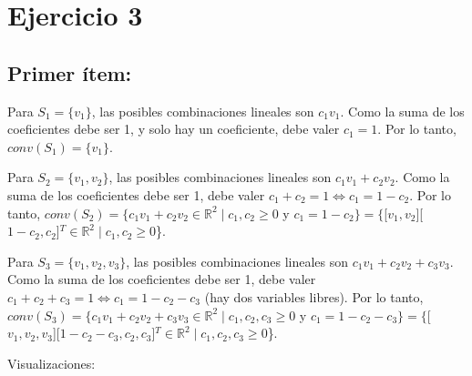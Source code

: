 \documentclass{article}
\begin{document}
\section*{Ejercicio 3}

\subsection*{Primer ítem:}
Para $S_1 = \{v_1\}$, las posibles combinaciones lineales son $c_1 v_1$. Como la suma de los coeficientes debe ser 1, y solo hay un coeficiente, debe valer $c_1 = 1$. Por lo tanto, $conv(S_1) = \{v_1\}$.
 
Para $S_2 = \{v_1, v_2\}$, las posibles combinaciones lineales son $c_1 v_1 + c_2 v_2$. Como la suma de los coeficientes debe ser 1, debe valer $c_1 + c_2= 1 \iff c_1 = 1 - c_2$. Por lo tanto, $conv(S_2) = \{c_1 v_1+ c_2 v_2 \in \mathbb{R}^2 \mid c_1, c_2 \geq 0$ y $ c_1 = 1- c_2\} = \{$[$v_1, v_2$][$1-c_2, c_2$]$^T \in \mathbb{R}^2 \mid c_1, c_2 \geq 0$\}.

Para $S_3 = \{v_1, v_2, v_3\}$, las posibles combinaciones lineales son $c_1 v_1 + c_2 v_2 + c_3 v_3$. Como la suma de los coeficientes debe ser 1, debe valer $c_1 + c_2 + c_3 = 1 \iff c_1 = 1 - c_2 - c_3$ (hay dos variables libres). Por lo tanto, $conv(S_3) = \{c_1 v_1+ c_2 v_2 + c_3 v_3\in \mathbb{R}^2 \mid c_1, c_2, c_3 \geq 0$ y $ c_1 = 1- c_2-c_3\} = \{$[$v_1, v_2, v_3$][$1-c_2 - c_3, c_2, c_3$]$^T\in \mathbb{R}^2 \mid c_1, c_2, c_3 \geq 0$\}.

Visualizaciones:
\end{document}
